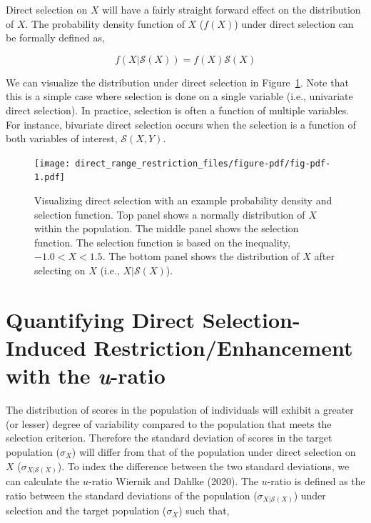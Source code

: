 \documentclass[
  letterpaper,
  DIV=11,
  numbers=noendperiod]{scrreprt}
\begin{document}
Direct selection on \(X\) will have a fairly straight forward effect on
the distribution of \(X\). The probability density function of \(X\)
(\(f(X)\)) under direct selection can be formally defined as,

\[
f\left(X|\mathcal{S}(X)\right) = f(X) \mathcal{S}(X)
\]

We can visualize the distribution under direct selection in
Figure~\ref{fig-pdf}. Note that this is a simple case where selection is
done on a single variable (i.e., univariate direct selection). In
practice, selection is often a function of multiple variables. For
instance, bivariate direct selection occurs when the selection is a
function of both variables of interest, \(\mathcal{S}(X,Y)\).

\begin{figure}[H]

{\centering \texttt{[image: direct\_range\_restriction\_files/figure-pdf/fig-pdf-1.pdf]}

}

\caption{\label{fig-pdf}Visualizing direct selection with an example
probability density and selection function. Top panel shows a normally
distribution of \(X\) within the population. The middle panel shows the
selection function. The selection function is based on the inequality,
\(-1.0<X<1.5\). The bottom panel shows the distribution of \(X\) after
selecting on \(X\) (i.e., \(X|\mathcal{S}(X)\)).}

\end{figure}

\hypertarget{quantifying-direct-selection-induced-restrictionenhancement-with-the-u-ratio}{%
\section{\texorpdfstring{Quantifying Direct Selection-Induced
Restriction/Enhancement with the
\emph{u}-ratio}{Quantifying Direct Selection-Induced Restriction/Enhancement with the u-ratio}}\label{quantifying-direct-selection-induced-restrictionenhancement-with-the-u-ratio}}

The distribution of scores in the population of individuals will exhibit
a greater (or lesser) degree of variability compared to the population
that meets the selection criterion. Therefore the standard deviation of
scores in the target population (\(\sigma_{X}\)) will differ from that
of the population under direct selection on \(X\)
(\(\sigma_{X|\mathcal{S}(X)}\)). To index the difference between the two
standard deviations, we can calculate the \(u\)-ratio Wiernik and Dahlke
(2020). The \(u\)-ratio is defined as the ratio between the standard
deviations of the population (\(\sigma_{X|\mathcal{S}(X)}\)) under
selection and the target population (\(\sigma_{X}\)) such that,
\end{document}
